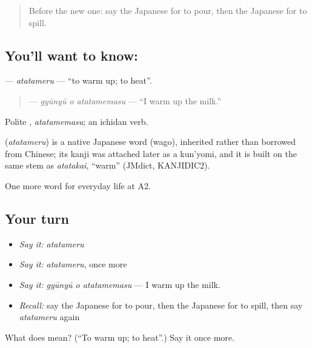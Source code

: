 \label{lesson:JA-C179-atatameru}



\begin{quote}
Before the new one: say the Japanese for to pour, then the Japanese for to spill.
\end{quote}

\subsection*{You'll want to know: }
\textbf{} — \emph{atatameru} — \textquotedblleft{}to warm up; to heat\textquotedblright{}.

\begin{quote}
\textbf{ } — \emph{gyūnyū o atatamemasu} — \textquotedblleft{}I warm up the milk.\textquotedblright{}
\end{quote}

Polite \textbf{}, \emph{atatamemasu}; an ichidan verb.

\begin{cousinweb}
\textbf{} (\emph{atatameru}) is a native Japanese word (wago), inherited rather than borrowed from Chinese; its kanji was attached later as a kun'yomi, and it is built on the same stem as \emph{atatakai}, \textquotedblleft{}warm\textquotedblright{} (JMdict, KANJIDIC2).
\end{cousinweb}

\begin{grammarlens}[title={What you've built}]
One more word for everyday life at A2.
\end{grammarlens}

\subsection*{Your turn}
\begin{itemize}
\raggedright
  \item \emph{Say it:} \emph{atatameru}
  \item \emph{Say it:} \emph{atatameru}, once more
  \item \emph{Say it:} \emph{gyūnyū o atatamemasu} — I warm up the milk.
  \item \emph{Recall:} say the Japanese for to pour, then the Japanese for to spill, then say \emph{atatameru} again
\end{itemize}

\begin{tcolorbox}[breakable,colback=teal!4,colframe=teal!35!black,title={Before you move on}]
What does  mean? (\textquotedblleft{}To warm up; to heat\textquotedblright{}.) Say it once more.
\end{tcolorbox}
